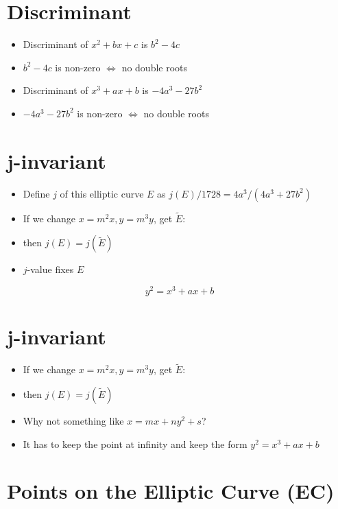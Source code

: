 \section*{Discriminant}

\begin{itemize}
	\item Discriminant of \( x^2 + bx + c \) is \( b^2 - 4c \)
	\item \( b^2 - 4c \) is non-zero \( \Leftrightarrow \) no double roots
	\item Discriminant of \( x^3 + ax + b \) is \( -4a^3 - 27b^2 \)
	\item \( -4a^3 - 27b^2 \) is non-zero \( \Leftrightarrow \) no double roots
\end{itemize}

\section*{j-invariant}

\begin{itemize}
	\item Define \( j \) of this elliptic curve \( E \) as \( j(E)/1728 = 4a^3/(4a^3 + 27b^2) \)
	\item If we change \( x = m^2x, y = m^3y \), get \( \tilde{E} \):
	\item then \( j(E) = j(\tilde{E}) \)
	\item \( j \)-value fixes \( E \)
\end{itemize}

\[ y^2 = x^3 + ax + b \]

\section*{j-invariant}

\begin{itemize}
	\item If we change \( x = m^2x, y = m^3y \), get \( \tilde{E} \):
	\item then \( j(E) = j(\tilde{E}) \)
	\item Why not something like \( x = mx + ny^2 + s \)?
	\item It has to keep the point at infinity and keep the form \( y^2 = x^3 + ax + b \)
\end{itemize}

\section*{Points on the Elliptic Curve (EC)}

